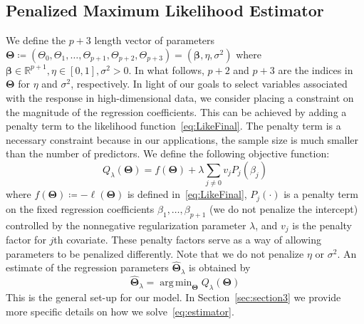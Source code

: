 \documentclass[12pt,letter]{article}\usepackage[]{graphicx}\usepackage[]{color}
\newcommand{\bTheta}{\boldsymbol{\Theta}}
\newcommand{\bbeta}{\boldsymbol{\beta}}
\DeclareMathOperator*{\argmin}{arg\,min}
\begin{document}



\subsection{Penalized Maximum Likelihood Estimator}
We define the $p+3$  length vector of parameters $\bTheta \coloneqq \left(\Theta_0, \Theta_1, \ldots, \Theta_{p+1}, \Theta_{p+2}, \Theta_{p+3}\right) =  \left(\bbeta, \eta, \sigma^2 \right)$ where $\bbeta \in \mathbb{R}^{p+1}, \eta \in [0,1], \sigma^2 >0$. In what follows, $p+2$ and $p+3$ are the indices in $\bTheta$ for $\eta$ and $\sigma^2$, respectively. In light of our goals to select variables associated with the response in high-dimensional data, we consider placing a constraint on the magnitude of the regression coefficients. This can be achieved by adding a penalty term to the likelihood function~\eqref{eq:LikeFinal}. The penalty term is a necessary constraint because in our applications, the sample size is much smaller than the number of predictors. We define the following objective function:
\begin{equation}
	Q_{\lambda}(\bTheta) = f(\bTheta) + \lambda \sum_{j\neq 0} v_j P_j(\beta_j)
\end{equation}
where $f(\bTheta)\coloneqq-\ell(\bTheta)$ is defined in~\eqref{eq:LikeFinal}, $P_j(\cdot)$ is a penalty term on the fixed regression coefficients $\beta_1, \ldots, \beta_{p+1}$ (we do not penalize the intercept) controlled by the nonnegative regularization parameter $\lambda$, and $v_j$ is the penalty factor for $j$th covariate. These penalty factors serve as a way of allowing parameters to be penalized differently. Note that we do not penalize $\eta$ or $\sigma^2$. An estimate of the regression parameters $\widehat{\bTheta}_{\lambda}$ is obtained by
\begin{equation}
	\widehat{\bTheta}_{\lambda} = \argmin_{\bTheta} Q_{\lambda}(\bTheta) \label{eq:estimator}
\end{equation}
This is the general set-up for our model. In Section~\ref{sec:section3} we provide more specific details on how we solve~\eqref{eq:estimator}. 
\end{document}
